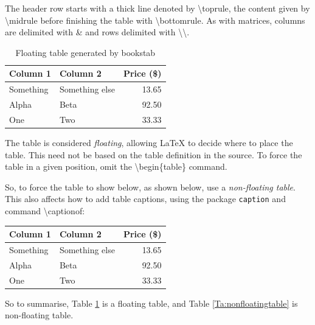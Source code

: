 \documentclass{sample}
\begin{document}
The header row starts with a thick line denoted by \textbackslash toprule, the content given by \textbackslash midrule before finishing the table with \textbackslash bottomrule. As with matrices, columns are delimited with \& and rows delimited with \textbackslash\textbackslash.

\begin{table}
\begin{center}
	\begin{tabular}{llr}
	\toprule
	Column 1 & Column 2 & Price (\$) \\
	\midrule
	Something & Something else & 13.65 \\
	Alpha & Beta & 92.50 \\
	One & Two & 33.33 \\
	\bottomrule
	\end{tabular}
	\caption{Floating table generated by bookstab}
	\label{Ta:floatingtable}
\end{center}
\end{table}

The table is considered \textit{floating}, allowing LaTeX to decide where to place the table. This need not be based on the table definition in the source. To force the table in a given position, omit the \textbackslash begin\{table\} command. 

So, to force the table to show below, as shown below, use a \textit{non-floating table}. This also affects how to add table captions, using the package \texttt{caption} and command \textbackslash captionof:

\begin{center}
	\begin{tabular}{llr}
	\toprule
	Column 1 & Column 2 & Price (\$) \\
	\midrule
	Something & Something else & 13.65 \\
	Alpha & Beta & 92.50 \\
	One & Two & 33.33 \\
	\bottomrule
	\end{tabular}
	\label{Ta:nonfloatingtable}
\end{center}

So to summarise, Table \ref{Ta:floatingtable} is a floating table, and Table \ref{Ta:nonfloatingtable} is non-floating table.
\end{document}
